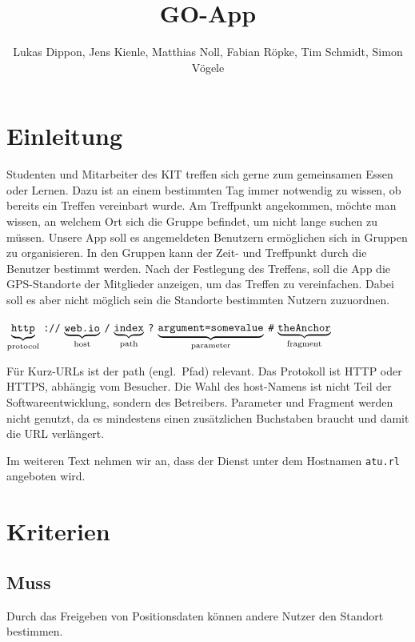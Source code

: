 \documentclass[parskip=full,11pt,twoside]{scrartcl}
\title{GO-App}
\author{Lukas Dippon, Jens Kienle, Matthias Noll, Fabian Röpke, Tim Schmidt, Simon Vögele}
\newcommand\urlpart[2]{$\underbrace{\text{\texttt{#1}}}_{\text{#2}}$}
\begin{document}
\maketitle

\section{Einleitung}

Studenten und Mitarbeiter des KIT treffen sich gerne zum gemeinsamen Essen oder Lernen.
Dazu ist an einem bestimmten Tag immer notwendig zu wissen, ob bereits ein Treffen vereinbart wurde.
Am Treffpunkt angekommen, möchte man wissen, an welchem Ort sich die Gruppe befindet, um nicht lange suchen zu müssen.
Unsere App soll es angemeldeten Benutzern ermöglichen sich in Gruppen zu organisieren.
In den Gruppen kann der Zeit- und Treffpunkt durch die Benutzer bestimmt werden.
Nach der Festlegung des Treffens, soll die App die GPS-Standorte der Mitglieder anzeigen, um das Treffen zu vereinfachen.
Dabei soll es aber nicht möglich sein die Standorte bestimmten Nutzern zuzuordnen.

\begin{center}
\urlpart{http}{protocol}%
\texttt{://}%
\urlpart{web.io}{host}%
\texttt{/}%
\urlpart{index}{path}%
\texttt{?}%
\urlpart{argument=somevalue}{parameter}%
\texttt{\#}%
\urlpart{theAnchor}{fragment}
\end{center}

Für Kurz-URLs ist der path (engl.\ Pfad) relevant.
Das Protokoll ist HTTP oder HTTPS, abhängig vom Besucher.
Die Wahl des host-Namens ist nicht Teil der Softwareentwicklung,
sondern des Betreibers.
Parameter und Fragment werden nicht genutzt,
da es mindestens einen zusätzlichen Buchstaben braucht
und damit die URL verlängert.

Im weiteren Text nehmen wir an,
dass der Dienst unter dem Hostnamen \texttt{atu.rl} angeboten wird.

\pagebreak
\section{Kriterien}

\subsection{Muss}

Durch das Freigeben von Positionsdaten können andere Nutzer den
Standort bestimmen.
\end{document}

